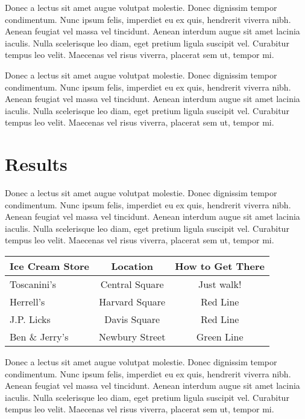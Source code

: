 \documentclass{article}
\begin{document}
\vspace{5mm}
Donec a lectus sit amet augue volutpat molestie. Donec dignissim tempor condimentum. Nunc ipsum felis, imperdiet
eu ex quis, hendrerit viverra nibh. Aenean feugiat vel massa vel tincidunt. Aenean interdum augue sit amet lacinia
iaculis. Nulla scelerisque leo diam, eget pretium ligula suscipit vel. Curabitur tempus leo velit. Maecenas vel
risus viverra, placerat sem ut, tempor mi.

\vspace{5mm}
Donec a lectus sit amet augue volutpat molestie. Donec dignissim tempor condimentum. Nunc ipsum felis, imperdiet
eu ex quis, hendrerit viverra nibh. Aenean feugiat vel massa vel tincidunt. Aenean interdum augue sit amet lacinia
iaculis. Nulla scelerisque leo diam, eget pretium ligula suscipit vel. Curabitur tempus leo velit. Maecenas vel
risus viverra, placerat sem ut, tempor mi.

\newpage
\section{Results}
Donec a lectus sit amet augue volutpat molestie. Donec dignissim tempor condimentum. Nunc ipsum felis, imperdiet
eu ex quis, hendrerit viverra nibh. Aenean feugiat vel massa vel tincidunt. Aenean interdum augue sit amet lacinia
iaculis. Nulla scelerisque leo diam, eget pretium ligula suscipit vel. Curabitur tempus leo velit. Maecenas vel
risus viverra, placerat sem ut, tempor mi.

\vspace{5mm}

\begin{table}[htbp]
\begin{tabular}{|l||c|c|} \hline\hline
Ice Cream Store & Location & How to Get There \\ \hline
Toscanini’s & Central Square & Just walk! \\
Herrell’s & Harvard Square & Red Line \\
J.P. Licks & Davis Square & Red Line \\
Ben \& Jerry’s & Newbury Street & Green Line \\ \hline\hline
\end{tabular}
\end{table}

\vspace{5mm}
Donec a lectus sit amet augue volutpat molestie. Donec dignissim tempor condimentum. Nunc ipsum felis, imperdiet
eu ex quis, hendrerit viverra nibh. Aenean feugiat vel massa vel tincidunt. Aenean interdum augue sit amet lacinia
iaculis. Nulla scelerisque leo diam, eget pretium ligula suscipit vel. Curabitur tempus leo velit. Maecenas vel
risus viverra, placerat sem ut, tempor mi.
\end{document}
